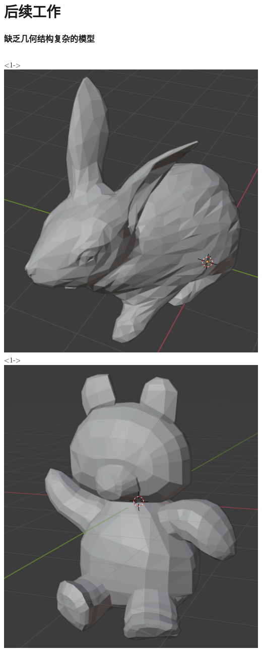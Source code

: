 \documentclass[UTF8]{ctexbeamer}	%
\theoremstyle{plain}
\theoremstyle{definition}
\theoremstyle{remark}
\numberwithin{equation}{section}
\begin{document}
\section{后续工作}
\begin{frame}
    \frametitle{缺乏几何结构复杂的模型}
    \begin{columns}
        <1->
        \includegraphics[width = \textwidth]{fig/wrong1.png}
        <1->
        \includegraphics[width = \textwidth]{fig/wrong2.png}

\end{columns}
\end{frame}
\end{document}
